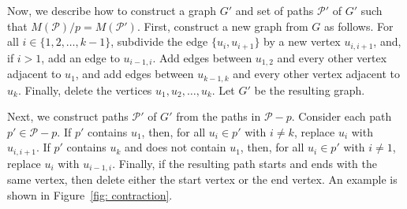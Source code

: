 \documentclass[11pt, reqno]{amsart}
\begin{document}
Now, we describe how to construct a graph $G'$ and set of paths $\mathcal P'$ of $G'$ such that $M(\mathcal P) / p = M(\mathcal P')$. First, construct a new graph from $G$ as follows. For all $i \in \{1,2,\ldots,k-1\}$, subdivide the edge $\{u_i,u_{i+1}\}$ by a new vertex $u_{i,i+1}$, and, if $i > 1$, add an edge to $u_{i-1,i}$. Add edges between $u_{1,2}$ and every other vertex adjacent to $u_1$, and add edges between $u_{k-1,k}$ and every other vertex adjacent to $u_k$. Finally, delete the vertices $u_1, u_2, \ldots, u_k$. Let $G'$ be the resulting graph.

Next, we construct paths $\mathcal P'$ of $G'$ from the paths in $\mathcal P - p$. Consider each path $p' \in \mathcal P - p$. If $p'$ contains $u_1$, then, for all $u_i \in p'$ with $i \neq k$, replace $u_i$ with $u_{i,i+1}$. If $p'$ contains $u_k$ and does not contain $u_1$, then, for all $u_i \in p'$ with $i \neq 1$, replace $u_i$ with $u_{i-1,i}$. Finally, if the resulting path starts and ends with the same vertex, then delete either the start vertex or the end vertex. An example is shown in Figure~\ref{fig: contraction}.
\end{document}
